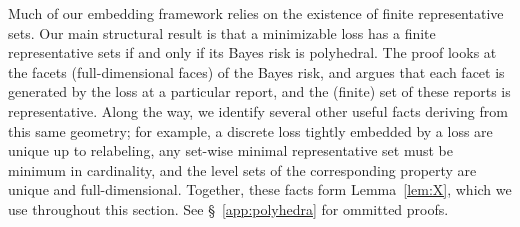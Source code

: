 \documentclass[twoside,11pt]{article}
\begin{document}
Much of our embedding framework relies on the existence of finite representative sets.
Our main structural result is that a minimizable loss has a finite representative sets if and only if its Bayes risk is polyhedral.
The proof looks at the facets (full-dimensional faces) of the Bayes risk, and argues that each facet is generated by the loss at a particular report, and the (finite) set of these reports is representative.
Along the way, we identify several other useful facts deriving from this same geometry; for example, a discrete loss tightly embedded by a loss are unique up to relabeling, any set-wise minimal representative set must be minimum in cardinality, and the level sets of the corresponding property are unique and full-dimensional.
Together, these facts form Lemma~\ref{lem:X}, which we use throughout this section.
See \S~\ref{app:polyhedra} for ommitted proofs.
\end{document}
